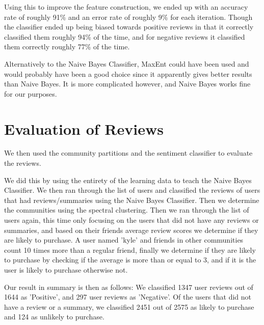 	Using this to improve the feature construction, we ended up with an accuracy rate of roughly 91\% and an error rate of roughly 9\% for each iteration. Though the classifier ended up being biased towards positive reviews in that it correctly classified them roughly 94\% of the time, and for negative reviews it classified them correctly roughly 77\% of the time.
	
	Alternatively to the Naive Bayes Classifier, MaxEnt could have been used and would probably have been a good choice since it apparently gives better results than Naive Bayes. It is more complicated however, and Naive Bayes works fine for our purposes. 
	
	\section{Evaluation of Reviews}
	We then used the community partitions and the sentiment classifier to evaluate the reviews. 

	We did this by using the entirety of the learning data to teach the Naive Bayes Classifier.
	We then ran through the list of users and classified the reviews of users that had reviews/summaries using the Naive Bayes Classifier.
	Then we determine the communities using the spectral clustering.
	Then we ran through the list of users again, this time only focusing on the users that did not have any reviews or summaries, and based on their friends average review scores we determine if they are likely to purchase. A user named 'kyle' and friends in other communities count 10 times more than a regular friend, finally we determine if they are likely to purchase by checking if the average is more than or equal to 3, and if it is the user is likely to purchase otherwise not.
	
	Our result in summary is then as follows:
	We classified 1347 user reviews out of 1644 as 'Positive', and 297 user reviews as 'Negative'.
	Of the users that did not have a review or a summary, we classified 2451 out of 2575 as likely to purchase and 124 as unlikely to purchase.


